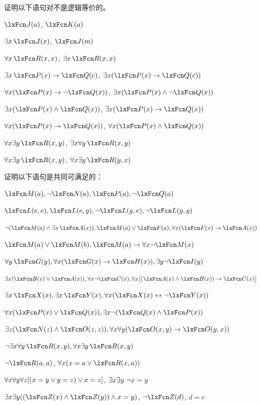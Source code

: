 \solutions
\problempart
\label{pr.NotEquiv}
证明以下语句对不是逻辑等价的。


\begin{compactlist}
\item $\atom{J}{a} $,  $\atom{K}{a}$
\item $\exists x\, \atom{J}{x}$,  $\atom{J}{m}$
\item $\forall x\, \atom{R}{x,x}$, $\exists x\, \atom{R}{x,x}$
\item $\exists x\, \atom{P}{x} \eif \atom{Q}{c}$, $\exists x (\atom{P}{x} \eif \atom{Q}{c})$
\item $\forall x(\atom{P}{x} \eif \enot \atom{Q}{x})$, $\exists x(\atom{P}{x} \eand \enot \atom{Q}{x})$
\item $\exists x(\atom{P}{x} \eand \atom{Q}{x})$, $\exists x(\atom{P}{x} \eif \atom{Q}{x})$
\item $\forall x(\atom{P}{x}\eif \atom{Q}{x})$, $\forall x(\atom{P}{x} \eand \atom{Q}{x})$
\item $\forall x\exists y\, \atom{R}{x,y}$, $\exists x\forall y\, \atom{R}{x,y}$
\item $\forall x\exists y\, \atom{R}{x,y}$, $\forall x\exists y\, \atom{R}{y,x}$
\end{compactlist}

\problempart
证明以下语句是共同可满足的：


\begin{compactlist}
\item  $\atom{M}{a}, \enot \atom{N}{a}, \atom{P}{a}, \enot \atom{Q}{a}$
\item $\atom{L}{e,e}, \atom{L}{e,g}, \enot \atom{L}{g,e}, \enot \atom{L}{g,g}$
\item $\enot (\atom{M}{a} \eand \exists x\, \atom{A}{x}), \atom{M}{a} \eor \atom{F}{a}, \forall x(\atom{F}{x} \eif \atom{A}{x})$
\item $\atom{M}{a} \eor \atom{M}{b}, \atom{M}{a} \eif \forall x \enot \atom{M}{x}$
\item $\forall y\, \atom{G}{y}, \forall x (\atom{G}{x} \eif \atom{H}{x}), \exists y \enot \atom{I}{y}$
\item $\exists x(\atom{B}{x} \eor \atom{A}{x}), \forall x \enot \atom{C}{x}, \forall x\bigl[(\atom{A}{x} \eand \atom{B}{x}) \eif \atom{C}{x}\bigr]$
\item $\exists x\, \atom{X}{x}, \exists x\, \atom{Y}{x}, \forall x(\atom{X}{x} \eiff \enot \atom{Y}{x})$
\item $\forall x(\atom{P}{x} \eor \atom{Q}{x}), \exists x\enot(\atom{Q}{x} \eand \atom{P}{x})$
\item $\exists z(\atom{N}{z} \eand \atom{O}{z,z}), \forall x\forall y(\atom{O}{x,y} \eif \atom{O}{y,x})$
\item $\enot \exists x \forall y\, \atom{R}{x,y}, \forall x \exists y\, \atom{R}{x,y}$
\item $\enot \atom{R}{a,a}$, $\forall x (x=a \eor \atom{R}{x,a})$
\item $\forall x\forall y\forall z[(x=y \vee y=z )\vee x=z]$, $\exists x\exists y\ \neg x= y$
\item $\exists x\exists y((\atom{Z}{x} \eand \atom{Z}{y} )\eand x=y)$, $\enot \atom{Z}{d}$, $d=e$
\end{compactlist}

